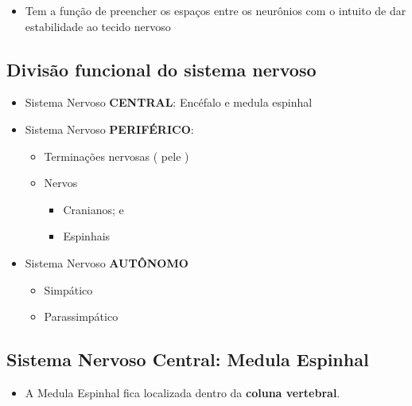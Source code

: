 \documentclass[
]{book}
\providecommand{\tightlist}{%
  \setlength{\itemsep}{0pt}\setlength{\parskip}{0pt}}
\begin{document}
\begin{itemize}
\tightlist
\item
  Tem a função de preencher os espaços entre os neurônios com o intuito de dar estabilidade ao tecido
  nervoso
\end{itemize}

\hypertarget{divisuxe3o-funcional-do-sistema-nervoso}{%
\subsection{Divisão funcional do sistema nervoso}\label{divisuxe3o-funcional-do-sistema-nervoso}}

\begin{itemize}
\tightlist
\item
  Sistema Nervoso \textbf{CENTRAL}: Encéfalo e medula espinhal
\item
  Sistema Nervoso \textbf{PERIFÉRICO}:

  \begin{itemize}
  \tightlist
  \item
    Terminações nervosas ( pele )
  \item
    Nervos

    \begin{itemize}
    \tightlist
    \item
      Cranianos; e
    \item
      Espinhais
    \end{itemize}
  \end{itemize}
\item
  Sistema Nervoso \textbf{AUTÔNOMO}

  \begin{itemize}
  \tightlist
  \item
    Simpático
  \item
    Parassimpático
  \end{itemize}
\end{itemize}

\hypertarget{sistema-nervoso-central-medula-espinhal}{%
\subsection{Sistema Nervoso Central: Medula Espinhal}\label{sistema-nervoso-central-medula-espinhal}}

\begin{itemize}
\tightlist
\item
  A Medula Espinhal fica localizada dentro da \textbf{coluna vertebral}.
\end{itemize}
\end{document}
